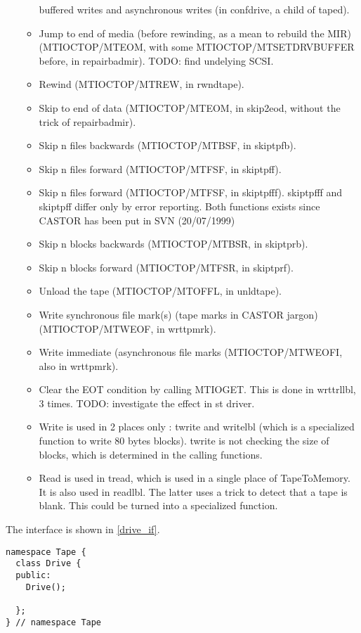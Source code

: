 \begin{itemize}
\begin{itemize}
          buffered writes and asynchronous writes (in confdrive, a child of taped).
    \item Jump to end of media (before rewinding, as a mean to rebuild the MIR) (MTIOCTOP/MTEOM, 
          with some MTIOCTOP/MTSETDRVBUFFER before, in repairbadmir). TODO: find undelying SCSI.
    \item Rewind (MTIOCTOP/MTREW, in rwndtape).
    \item Skip to end of data (MTIOCTOP/MTEOM, in skip2eod, without the trick of repairbadmir).
    \item Skip n files backwards (MTIOCTOP/MTBSF, in skiptpfb).
    \item Skip n files forward (MTIOCTOP/MTFSF, in skiptpff).
    \item Skip n files forward (MTIOCTOP/MTFSF, in skiptpfff). skiptpfff and skiptpff differ only 
          by error reporting. Both functions exists since CASTOR has been put in SVN (20/07/1999)
    \item Skip n blocks backwards (MTIOCTOP/MTBSR, in skiptprb).
    \item Skip n blocks forward (MTIOCTOP/MTFSR, in skiptprf).
    \item Unload the tape (MTIOCTOP/MTOFFL, in unldtape).
    \item Write synchronous file mark(s) (tape marks in CASTOR jargon) (MTIOCTOP/MTWEOF, in wrttpmrk).
    \item Write immediate (asynchronous file marks (MTIOCTOP/MTWEOFI, also in wrttpmrk).
    \item Clear the EOT condition by calling MTIOGET. This is done in wrttrllbl, 3 times. 
          TODO: investigate the effect in st driver.
    \item Write is used in 2 places only : twrite and writelbl (which is a specialized 
          function to write 80 bytes blocks). twrite is not checking the size of blocks,
          which is determined in the calling functions.
    \item Read is used in tread, which is used in a single place of TapeToMemory. It is 
          also used in readlbl. The latter uses a trick to detect that a tape is blank.
          This could be turned into a specialized function.
  \end{itemize}
\end{itemize}
The interface is shown in \ref{drive_if}.

\begin{lstlisting}[caption=Tape::Drive interface,label=drive_if]
namespace Tape {
  class Drive {
  public:
    Drive();
    
  };
} // namespace Tape
\end{lstlisting}


